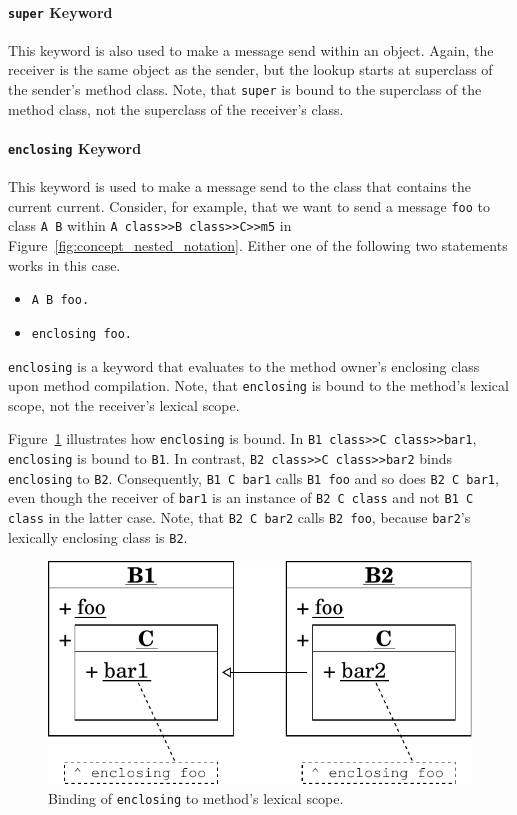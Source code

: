 \paragraph{\texttt{super} Keyword}
This keyword is also used to make a message send within an object. Again, the receiver is the same object as the sender, but the lookup starts at superclass of the sender's method class. Note, that \texttt{super} is bound to the superclass of the method class, not the superclass of the receiver's class.

\paragraph{\texttt{enclosing} Keyword}
This keyword is used to make a message send to the class that contains the current current. Consider, for example, that we want to send a message \texttt{foo} to class \texttt{A B} within \texttt{A class>>B class>>C>>m5} in Figure~\ref{fig:concept_nested_notation}. Either one of the following two statements works in this case.

\begin{itemize}
	\item \texttt{A B foo.}
	\item \texttt{enclosing foo.}
\end{itemize}

\texttt{enclosing} is a keyword that evaluates to the method owner's enclosing class upon method compilation. Note, that \texttt{enclosing} is bound to the method's lexical scope, not the receiver's lexical scope.

Figure~\ref{fig:concept_lexical_thisouter} illustrates how \texttt{enclosing} is bound. In \texttt{B1 class>>C class>>bar1}, \texttt{enclosing} is bound to \texttt{B1}. In contrast, \texttt{B2 class>>C class>>bar2} binds \texttt{enclosing} to \texttt{B2}. Consequently, \texttt{B1 C bar1} calls \texttt{B1 foo} and so does \texttt{B2 C bar1}, even though the receiver of \texttt{bar1} is an instance of \texttt{B2 C class} and not \texttt{B1 C class} in the latter case. Note, that \texttt{B2 C bar2} calls \texttt{B2 foo}, because \texttt{bar2}'s lexically enclosing class is \texttt{B2}.

\begin{figure}[!htp]
	\includegraphics[scale=0.75]{nested_lexical1.pdf}
	\centering
	\caption{Binding of \texttt{enclosing} to method's lexical scope.}
	\label{fig:concept_lexical_thisouter}
\end{figure}

